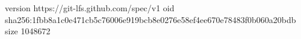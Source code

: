 version https://git-lfs.github.com/spec/v1
oid sha256:1fbb8a1c0e471cb5c76006e919bcb8e0276e58ef4ee670e78483f0b060a20bdb
size 1048672
